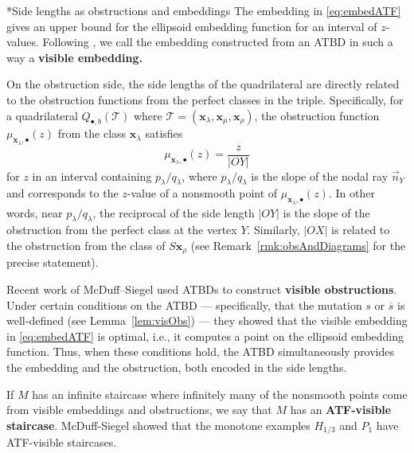 \documentclass[11pt, reqno]{amsart}
\makeatletter
\def\subsubsection{\@startsection{subsubsection}{3}%
  \z@{.5\linespacing\@plus.7\linespacing}{-.5em}%
  {\normalfont\bfseries}}
\theoremstyle{remark}
\numberwithin{equation}{subsection}
\numberwithin{figure}{section}
\theoremstyle{customremark}
\newcommand{\la}{{\lambda}}
\makeatother
\begin{document}
\subsubsection*{Side lengths as obstructions and embeddings}
The embedding in \eqref{eq:embedATF} gives an upper bound for the ellipsoid embedding function for an interval of $z$-values. Following \cite{McSi}, we call the embedding constructed from an ATBD in such a way a {\bf visible embedding.}




On the obstruction side, the side lengths of the quadrilateral are directly related
to the obstruction functions from the perfect classes in the triple. Specifically,
for a quadrilateral $Q_{\bullet,b}(\mathcal{T})$ where
$\mathcal{T} = (\boldsymbol{x}_\lambda, \boldsymbol{x}_\mu, \boldsymbol{x}_\rho)$,
the obstruction function $\mu_{\boldsymbol{x}_\lambda, \bullet}(z)$ from the class
$\boldsymbol{x}_\lambda$ satisfies
\begin{equation}\label{eq:obslengths}
\mu_{\boldsymbol{x}_\lambda, \bullet}(z) = \frac{z}{|OY|}
\end{equation}
for $z$ in an interval containing $p_\lambda/q_\lambda$, where $p_\lambda/q_\lambda$
is the slope of the nodal ray $\vec{n}_Y$ and corresponds to the $z$-value of a
nonsmooth point of $\mu_{\boldsymbol{x}_\lambda, \bullet}(z)$. In other words, near $p_\la/q_\la$, the
reciprocal of the side length $|OY|$ is the slope of the obstruction from the
perfect class at the vertex $Y$. Similarly, $|OX|$ is related to the obstruction
from the class of $S\bm{x}_\rho$ (see Remark~\ref{rmk:obsAndDiagrams} for the precise statement). 


Recent work of McDuff--Siegel \cite{McSi} used ATBDs to construct \textbf{visible
obstructions}. Under certain conditions on the ATBD --- specifically, that the
mutation $s$ or $\overline{s}$ is well-defined (see Lemma~\ref{lem:visObs}) --- they
showed that the visible embedding in \eqref{eq:embedATF} is optimal, i.e., it computes a point on the ellipsoid embedding function. Thus, when these conditions hold, the ATBD simultaneously provides the embedding and the obstruction, both encoded in the side lengths.

 
If $M$ has an infinite staircase where infinitely many of the nonsmooth points come from visible embeddings and obstructions, we say that $M$ has an {\bf ATF-visible staircase}. McDuff-Siegel showed that the monotone examples $H_{1/3}$ and $P_{1}$ have ATF-visible staircases.
\end{document}
